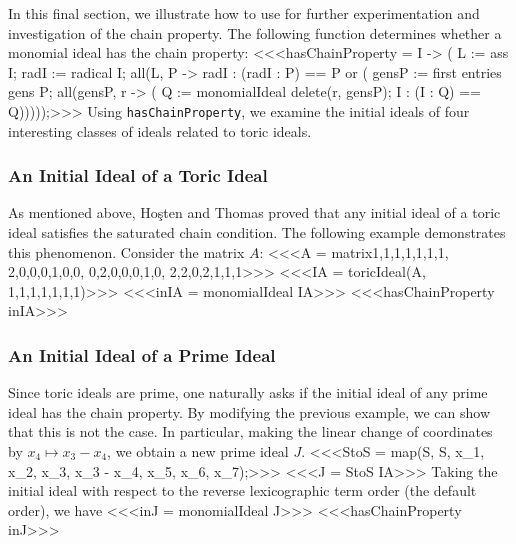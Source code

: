 In this final section, we illustrate how to use \Mtwo for further
experimentation and investigation of the chain property.  The
following function determines whether a monomial ideal has the chain
property:
<<<hasChainProperty = I -> (
     L := ass I;
     radI := radical I;
     all(L, P -> radI : (radI : P) == P or (
               gensP := first entries gens P;
               all(gensP, r -> (
                         Q := monomialIdeal delete(r, gensP);
                         I : (I : Q) == Q)))));>>>
Using {\tt hasChainProperty}, we examine the initial ideals of four
interesting classes of ideals related to toric ideals.

\subsubsection*{An Initial Ideal of a Toric Ideal}  As mentioned above, Ho\c{s}ten
and Thomas proved that any initial ideal of a toric ideal satisfies
the saturated chain condition.  The following example demonstrates this
phenomenon.  Consider the matrix $A$:
<<<A = matrix{{1,1,1,1,1,1,1}, {2,0,0,0,1,0,0}, {0,2,0,0,0,1,0}, {2,2,0,2,1,1,1}}>>>
<<<IA = toricIdeal(A, {1,1,1,1,1,1,1})>>>
<<<inIA = monomialIdeal IA>>>
<<<hasChainProperty inIA>>>

\subsubsection*{An Initial Ideal of a Prime Ideal}  Since toric ideals are
prime, one naturally asks if the initial ideal of any prime ideal has
the chain property.  By modifying the previous example, we can show
that this is not the case.  In particular, making the linear change of
coordinates by $x_{4} \mapsto x_{3}-x_{4}$, we obtain a new prime
ideal $J$.
<<<StoS = map(S, S, {x_1, x_2, x_3, x_3 - x_4, x_5, x_6, x_7});>>>
<<<J = StoS IA>>>
Taking the initial ideal with respect to the reverse lexicographic
term order (the default order), we have
<<<inJ = monomialIdeal J>>>
<<<hasChainProperty inJ>>>

